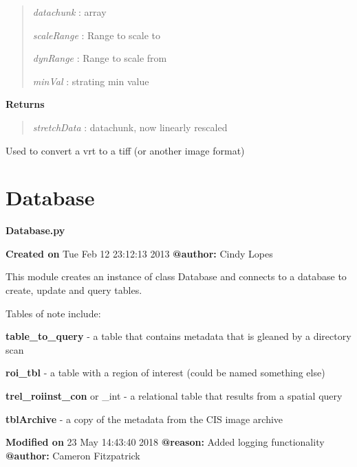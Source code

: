 \documentclass[letterpaper,10pt,openany,oneside]{sphinxmanual}
\begin{document}
\begin{fulllineitems}
\begin{fulllineitems}
\begin{quote}
\emph{datachunk}   : array

\emph{scaleRange}  : Range to scale to

\emph{dynRange}    : Range to scale from

\emph{minVal}      : strating min value
\end{quote}

\textbf{Returns}
\begin{quote}

\emph{stretchData} : datachunk, now linearly rescaled
\end{quote}

\end{fulllineitems}


\begin{fulllineitems}
\label{code:Image.Image.vrt2RealImg}
Used to convert a vrt to a tiff (or another image format)

\end{fulllineitems}


\end{fulllineitems}



\section{Database}
\label{code:database}\label{code:module-Database}
\textbf{Database.py}

\textbf{Created on} Tue Feb 12 23:12:13 2013 \textbf{@author:} Cindy Lopes

This module creates an instance of class Database and connects to a database to
create, update and query tables.

Tables of note include:

\textbf{table\_to\_query} - a table that contains metadata that is gleaned by a directory scan

\textbf{roi\_tbl} - a table with a region of interest (could be named something else)

\textbf{trel\_roiinst\_con} or \_int - a relational table that results from a spatial query

\textbf{tblArchive} - a copy of the metadata from the CIS image archive

\textbf{Modified on} 23 May 14:43:40 2018 \textbf{@reason:} Added logging functionality \textbf{@author:} Cameron Fitzpatrick
\end{document}

